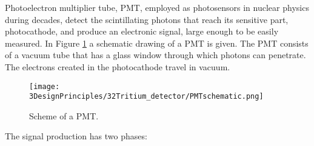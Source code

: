 Photoelectron multiplier tube, PMT, employed as photosensors in nuclear physics during decades, detect the scintillating photons that reach its sensitive part, photocathode, and produce an electronic signal, large enough to be easily measured. In Figure \ref{fig:SchemePMT} a schematic drawing of a PMT is given. The PMT consists of a vacuum tube that has a glass window through which photons can penetrate. The electrons created in the photocathode travel in vacuum. 

\begin{figure}[htbp]
\centering
\texttt{[image: 3DesignPrinciples/32Tritium\_detector/PMTschematic.png]}
\caption{Scheme of a PMT.\label{fig:SchemePMT}~\cite{Knoll}}
\end{figure}

The signal production has two phases:

